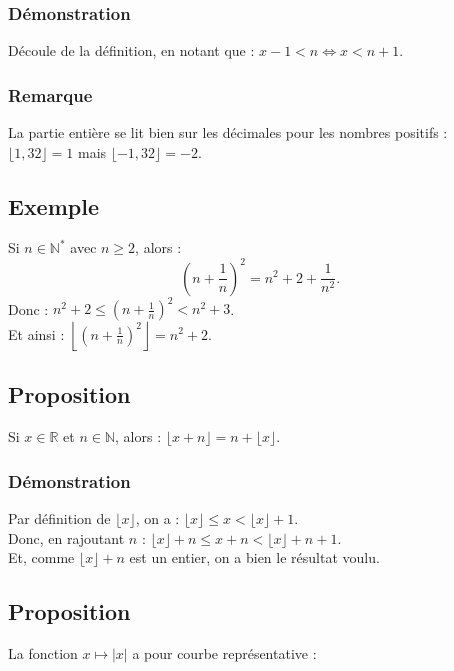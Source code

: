 \documentclass{article}
\begin{document}
		\subsubsection{Démonstration}
		Découle de la définition, en notant que : $x - 1 < n \Leftrightarrow x < n + 1$.
		
		\subsubsection{Remarque }
		La partie entière se lit bien sur les décimales pour les nombres positifs : $\lfloor 1,32 \rfloor = 1$ mais $\lfloor -1,32 \rfloor = -2$.
		
		\subsection{Exemple }
		Si $n \in \mathbb{N}^*$ avec $n \geq 2$, alors :
		\[
		(n+\frac{ 1}{n})^2 = n^2 + 2 + \frac{1}{n^2}.
		\]
		Donc : $n^2 + 2 \leq (n+\frac{ 1}{n})^2 < n^2 + 3$.
		\\ 
		Et ainsi : $\left\lfloor (n+\frac{ 1}{n})^2 \right\rfloor = n^2 + 2$.
		
		\subsection{Proposition }
		Si $x \in \mathbb{R}$ et $n \in \mathbb{N}$, alors : $\lfloor x + n \rfloor = n + \lfloor x \rfloor$.
		
		\subsubsection{Démonstration}
		Par définition de $\lfloor x \rfloor$, on a : $\lfloor x \rfloor \leq x < \lfloor x \rfloor + 1$. \\
		 Donc, en rajoutant $n$ : $\lfloor x \rfloor + n \leq x + n < \lfloor x \rfloor + n + 1$. \\
		 Et, comme $\lfloor x \rfloor + n$ est un entier, on a bien le résultat voulu.
		
		\subsection{Proposition }
		La fonction $x \mapsto |x|$ a pour courbe représentative :
		
	
\end{document}
